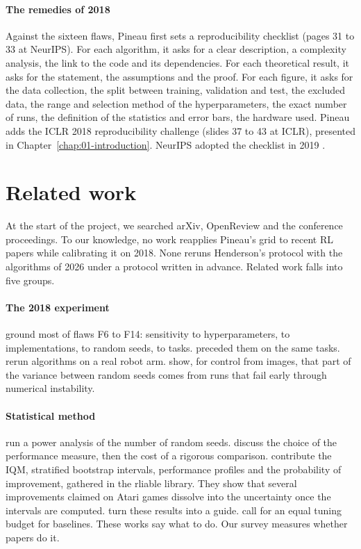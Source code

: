 \paragraph{The remedies of 2018}
Against the sixteen flaws, Pineau first sets a reproducibility checklist (pages 31 to 33 at NeurIPS).
For each algorithm, it asks for a clear description, a complexity analysis, the link to the code and
its dependencies. For each theoretical result, it asks for the statement, the assumptions and the
proof. For each figure, it asks for the data collection, the split between training, validation and
test, the excluded data, the range and selection method of the hyperparameters, the exact number of
runs, the definition of the statistics and error bars, the hardware used. Pineau adds the ICLR 2018
reproducibility challenge (slides 37 to 43 at ICLR), presented in Chapter~\ref{chap:01-introduction}.
NeurIPS adopted the checklist in 2019 \parencite{pineau2021improving}.

\section{Related work}\label{sec:voisins}

At the start of the project, we searched arXiv, OpenReview and the conference proceedings. To our knowledge, no
work reapplies Pineau's grid to recent RL papers while calibrating it on 2018. None reruns
Henderson's protocol with the algorithms of 2026 under a protocol written in advance. Related
work falls into five groups.

\paragraph{The 2018 experiment}
\textcite{henderson2018matters} ground most of flaws F6 to F14: sensitivity to hyperparameters, to
implementations, to random seeds, to tasks. \textcite{islam2017reproducibility} preceded them on the
same tasks. \textcite{lynnerup2020survey} rerun algorithms on a real robot arm.
\textcite{bjorck2022variance} show, for control from images, that part of the variance between random
seeds comes from runs that fail early through numerical instability.

\paragraph{Statistical method}
\textcite{colas2018seeds} run a power analysis of the number of random seeds.
\textcite{jordan2020evaluating} discuss the choice of the performance measure, then
\textcite{jordan2024position} the cost of a rigorous comparison. \textcite{agarwal2021precipice}
contribute the IQM, stratified bootstrap intervals, performance profiles and the probability of
improvement, gathered in the rliable library. They show that several improvements claimed on Atari
games dissolve into the uncertainty once the intervals are computed. \textcite{patterson2024empirical}
turn these results into a guide. \textcite{eimer2023hyperparameters} call for an equal tuning budget
for baselines. These works say what to do. Our survey measures whether papers do it.

